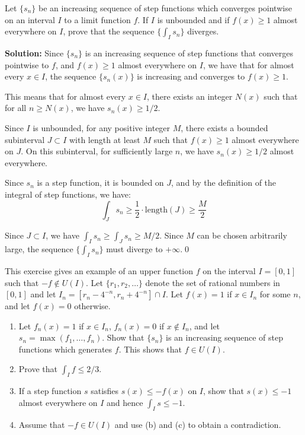 \begin{problembox}
Let $\{s_n\}$ be an increasing sequence of step functions which converges pointwise on an interval $I$ to a limit function $f$. If $I$ is unbounded and if $f(x) \geq 1$ almost everywhere on $I$, prove that the sequence $\{\int_I s_n\}$ diverges.
\end{problembox}

\bigskip\noindent\textbf{Solution:}
Since $\{s_n\}$ is an increasing sequence of step functions that converges pointwise to $f$, and $f(x) \geq 1$ almost everywhere on $I$, we have that for almost every $x \in I$, the sequence $\{s_n(x)\}$ is increasing and converges to $f(x) \geq 1$.

This means that for almost every $x \in I$, there exists an integer $N(x)$ such that for all $n \geq N(x)$, we have $s_n(x) \geq 1/2$.

Since $I$ is unbounded, for any positive integer $M$, there exists a bounded subinterval $J \subset I$ with length at least $M$ such that $f(x) \geq 1$ almost everywhere on $J$. On this subinterval, for sufficiently large $n$, we have $s_n(x) \geq 1/2$ almost everywhere.

Since $s_n$ is a step function, it is bounded on $J$, and by the definition of the integral of step functions, we have:
\[\int_J s_n \geq \frac{1}{2} \cdot \text{length}(J) \geq \frac{M}{2}\]

Since $J \subset I$, we have $\int_I s_n \geq \int_J s_n \geq M/2$. Since $M$ can be chosen arbitrarily large, the sequence $\{\int_I s_n\}$ must diverge to $+\infty$.\qed


\begin{problembox}
This exercise gives an example of an upper function $f$ on the interval $I = [0, 1]$ such that $-f \notin U(I)$. Let $\{r_1, r_2, \ldots\}$ denote the set of rational numbers in $[0, 1]$ and let $I_n = [r_n - 4^{-n}, r_n + 4^{-n}] \cap I$. Let $f(x) = 1$ if $x \in I_n$ for some $n$, and let $f(x) = 0$ otherwise.
\begin{enumerate}[label=(\alph*)]
    \item Let $f_n(x) = 1$ if $x \in I_n$, $f_n(x) = 0$ if $x \notin I_n$, and let $s_n = \max(f_1, \ldots, f_n)$. Show that $\{s_n\}$ is an increasing sequence of step functions which generates $f$. This shows that $f \in U(I)$.
    \item Prove that $\int_I f \leq 2/3$.
    \item If a step function $s$ satisfies $s(x) \leq -f(x)$ on $I$, show that $s(x) \leq -1$ almost everywhere on $I$ and hence $\int_I s \leq -1$.
    \item Assume that $-f \in U(I)$ and use (b) and (c) to obtain a contradiction.
\end{enumerate}
\end{problembox}

